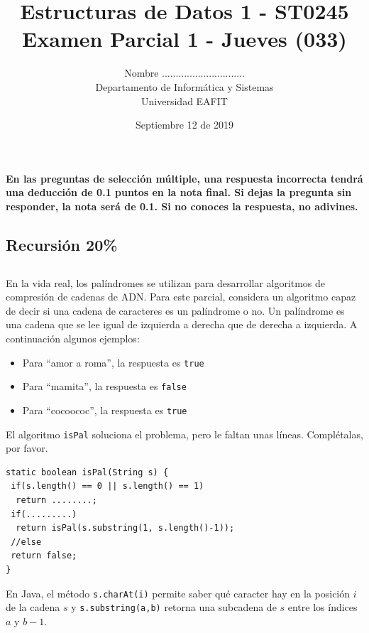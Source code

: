 \documentclass[10 pt]{article}
\title{\textbf {Estructuras de Datos 1 - ST0245\\Examen Parcial 1 - Jueves (033)
}}
\author{Nombre ..............................\\
		Departamento de Informática y Sistemas\\
		Universidad EAFIT\\}
\date{Septiembre 12 de 2019}
\begin{document}
\lstset{escapechar=@,style=customc, numbers=left, stepnumber = 1} 
\maketitle

\textbf{En las preguntas de selección múltiple, una respuesta incorrecta tendrá
una deducción de 0.1 puntos en la nota final. Si dejas la pregunta sin
responder, la nota será de 0.1. Si no conoces la respuesta, no adivines.}


\begin{multicols}{2}



\section{Recursión 20\%}
\subsection{} En la vida real, los palíndromes se utilizan para desarrollar algoritmos de compresión de cadenas de ADN. Para este parcial, considera un algoritmo capaz de decir si una cadena de caracteres es un palíndrome o no. Un palíndrome es una cadena que se lee igual de izquierda a derecha que de derecha a izquierda. A continuación algunos ejemplos:
\begin{itemize}
	\item Para ``amor a roma'', la respuesta es \texttt{true}
	\item Para ``mamita'', la respuesta es \texttt{false}
	\item Para ``cocoococ'', la respuesta es \texttt{true}
\end{itemize}
El algoritmo \texttt{isPal} soluciona el problema, pero le faltan unas líneas. Complétalas, por favor.
{\small
\begin{lstlisting}
static boolean isPal(String s) {   
 if(s.length() == 0 || s.length() == 1)
  return ........; 
 if(.........)
  return isPal(s.substring(1, s.length()-1));
 //else
 return false;
}
\end{lstlisting}
}

 En Java,
el método \texttt{s.charAt(i)} permite saber qué caracter hay en la posición $i$ de la cadena $s$ y \texttt{s.substring(a,b)} retorna una subcadena de $s$ entre los índices $a$ y $b-1$.


\end{multicols}
\end{document}

